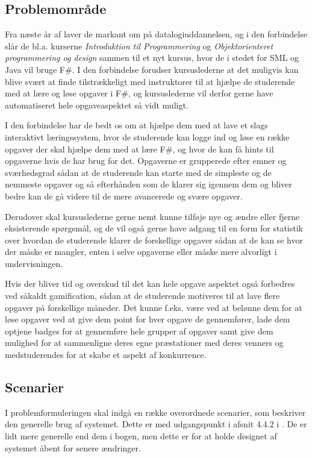 \documentclass[12pt]{article}
\begin{document}
\subsection{Problemområde}
Fra næste år af laver de markant om på datalogiuddannelsen, og i den forbindelse slår de bl.a. kurserne \emph{Introduktion til Programmering} og \emph{Objektorienteret programmering og design} sammen til et nyt kursus, hvor de i stedet for SML og Java vil bruge F\#.
I den forbindelse forudser kursuslederne at det muligvis kan blive svært at finde tilstrækkeligt med instruktorer til at hjælpe de studerende med at lære og løse opgaver i F\#, og kursuslederne vil derfor gerne have automatiseret hele opgaveaspektet så vidt muligt.

I den forbindelse har de bedt os om at hjælpe dem med at lave et slags interaktivt læringssystem, hvor de studerende kan logge ind og løse en række opgaver der skal hjælpe dem med at lære F\#, og hvor de kan få hints til opgaverne hvis de har brug for det. Opgaverne er grupperede efter emner og sværhedsgrad sådan at de studerende kan starte med de simpleste og de nemmeste opgaver og så efterhånden som de klarer sig igennem dem og bliver bedre kan de gå videre til de mere avancerede og svære opgaver.

Derudover skal kursuslederne gerne nemt kunne tilføje nye og ændre eller fjerne eksisterende spørgsmål, og de vil også gerne have adgang til en form for statistik over hvordan de studerende klarer de forskellige opgaver sådan at de kan se hvor der måske er mangler, enten i selve opgaverne eller måske mere alvorligt i undervisningen.

Hvis der bliver tid og overskud til det kan hele opgave aspektet også forbedres ved såkaldt gamification, sådan at de studerende motiveres til at lave flere opgaver på forskellige måneder. Det kunne f.eks. være ved at belønne dem for at løse opgaver ved at give dem point for hver opgave de gennemfører, lade dem optjene badges for at gennemføre hele grupper af opgaver samt give dem mulighed for at sammenligne deres egne præstationer med deres venners og medstuderendes for at skabe et aspekt af konkurrence.


\subsection{Scenarier}
I problemformuleringen skal indgå en række overordnede scenarier, som beskriver den generelle brug af systemet. Dette er med udgangspunkt i afsnit 4.4.2 i \cite{OOSE}. De er lidt mere generelle end dem i bogen, men dette er for at holde designet af systemet åbent for senere ændringer.
\end{document}
